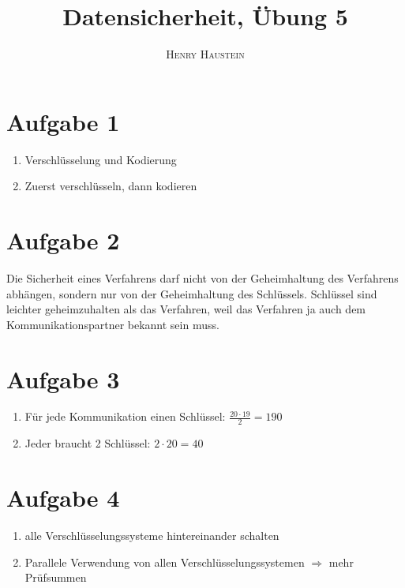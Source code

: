 \documentclass{article}
\title{\textbf{Datensicherheit, Übung 5}}
\author{\textsc{Henry Haustein}}
\date{}
\begin{document}
	\maketitle
	
	\section*{Aufgabe 1}
	\begin{enumerate}[label=(\alph*)]
		\item Verschlüsselung und Kodierung
		\item Zuerst verschlüsseln, dann kodieren
	\end{enumerate}

	\section*{Aufgabe 2}
	Die Sicherheit eines Verfahrens darf nicht von der Geheimhaltung des Verfahrens abhängen, sondern nur von der Geheimhaltung des Schlüssels. Schlüssel sind leichter geheimzuhalten als das Verfahren, weil das Verfahren ja auch dem Kommunikationspartner bekannt sein muss.
	
	\section*{Aufgabe 3}
	\begin{enumerate}[label=(\alph*)]
		\item Für jede Kommunikation einen Schlüssel: $\frac{20\cdot 19}{2} = 190$
		\item Jeder braucht 2 Schlüssel: $2\cdot 20 = 40$
	\end{enumerate}
	
	\section*{Aufgabe 4}
	\begin{enumerate}[label=(\alph*)]
		\item alle Verschlüsselungssysteme hintereinander schalten
		\item Parallele Verwendung von allen Verschlüsselungssystemen $\Rightarrow$ mehr Prüfsummen
	\end{enumerate}
	
\end{document}
